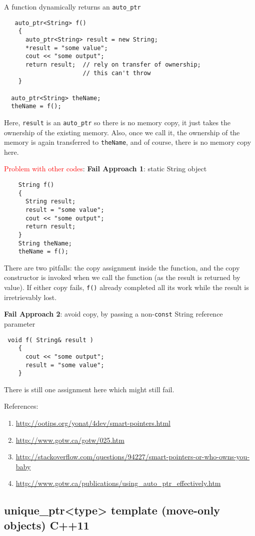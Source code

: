 \begin{enumerate}
A function dynamically returns an \verb!auto_ptr!  
\begin{lstlisting}
   auto_ptr<String> f()
    {
      auto_ptr<String> result = new String;
      *result = "some value";
      cout << "some output";
      return result;  // rely on transfer of ownership;
                      // this can't throw
    }
    
  auto_ptr<String> theName;
  theName = f();    
\end{lstlisting}
Here, \verb!result! is an \verb!auto_ptr! so there is no memory copy, it just
takes the ownership of the existing memory. Also, once we call it, the ownership
of the memory is again transferred to \verb!theName!, and of course, there is no
memory copy here.

\textcolor{red}{Problem with other codes}:
{\bf Fail Approach 1}: static String object
\begin{verbatim}
    String f()
    {
      String result;
      result = "some value";
      cout << "some output";
      return result;
    }
    String theName;
    theName = f();    
\end{verbatim}
There are two pitfalls: the copy assignment inside the function, and the copy
constructor is invoked when we call the function (as the result is returned by
value). If either copy fails, \verb!f()! already completed all its work while
the result is irretrievably lost.

{\bf Fail Approach 2}: avoid copy, by passing a non-\verb!const! String
reference parameter 
\begin{verbatim}
 void f( String& result )
    {
      cout << "some output";
      result = "some value";
    }
\end{verbatim}
There is still one assignment here which might still fail.


\end{enumerate}

References:
\begin{enumerate}
  \item \url{http://ootips.org/yonat/4dev/smart-pointers.html}
  \item \url{http://www.gotw.ca/gotw/025.htm}
  \item
  \url{http://stackoverflow.com/questions/94227/smart-pointers-or-who-owns-you-baby}
  \item 
  \url{http://www.gotw.ca/publications/using_auto_ptr_effectively.htm}
\end{enumerate}


\subsection{unique\_ptr<type> template (move-only objects) C++11}
\label{sec:unique_ptr}


